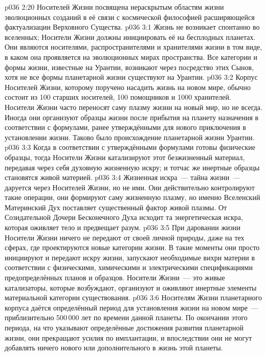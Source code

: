 \vs p036 2:20 \pc {} Носителей Жизни посвящена нераскрытым областям жизни эволюционных созданий в её связи с космической философией расширяющейся фактуализации Верховного Существа.
\vs p036 3:1 Жизнь не возникает спонтанно во вселенных; Носители Жизни должны инициировать её на бесплодных планетах. Они являются носителями, распространителями и хранителями жизни в том виде, в каком она проявляется на эволюционных мирах пространства. Все категории и формы жизни, известные на Урантии, возникают через посредство этих Сынов, хотя не все формы планетарной жизни существуют на Урантии.
\vs p036 3:2 Корпус Носителей Жизни, которому поручено насадить жизнь на новом мире, обычно состоит из 100 старших носителей, 100 помощников и 1000 хранителей. Носители Жизни часто переносят саму плазму жизни на новый мир, но не всегда. Иногда они организуют образцы жизни после прибытия на планету назначения в соответствии с формулами, ранее утверждёнными для нового приключения в установлении жизни. Таково было происхождение планетарной жизни Урантии.
\vs p036 3:3 Когда в соответствии с утверждёнными формулами готовы физические образцы, тогда Носители Жизни катализируют этот безжизненный материал, передавая через себя духовную жизненную искру; и тотчас же инертные образцы становятся живой материей.
\vs p036 3:4 \pc Жизненная искра~--- тайна жизни~--- даруется через Носителей Жизни, но не ими. Они действительно контролируют такие операции, они формируют саму жизненную плазму, но именно Вселенский Материнский Дух поставляет существенный фактор живой плазмы. От Созидательной Дочери Бесконечного Духа исходит та энергетическая искра, которая оживляет тело и предвещает разум.
\vs p036 3:5 \pc При даровании жизни Носители Жизни ничего не передают от своей личной природы, даже на тех сферах, где проектируются новые категории жизни. В такие моменты они просто инициируют и передают искру жизни, запускают необходимые вихри материи в соответствии с физическими, химическими и электрическими спецификациями предопределённых планов и образцов. Носители Жизни~--- это живые катализаторы, которые возбуждают, организуют и оживляют инертные элементы материальной категории существования.
\vs p036 3:6 \pc Носителям Жизни планетарного корпуса даётся определённый период для установления жизни на новом мире~--- приблизительно 500\,000 лет по времени данной планеты. По окончании этого периода, на что указывают определённые достижения развития планетарной жизни, они прекращают усилия по имплантации, и впоследствии они не могут добавлять ничего нового или дополнительного в жизнь этой планеты.
